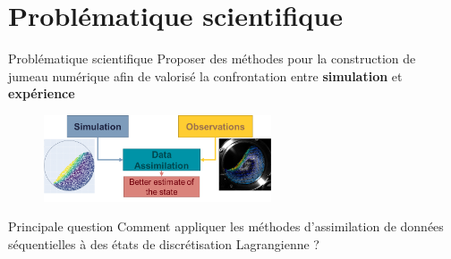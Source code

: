 \documentclass[aspectratio=169]{beamer} %
\begin{document}
\section{Problématique scientifique}
\begin{frame}{Problématique scientifique}
    Proposer des méthodes pour la construction de jumeau numérique afin de valorisé la confrontation entre \textbf{simulation} et \textbf{expérience}
    \begin{figure}
        \includegraphics[width = 0.6\textwidth]{image/da_rot_drum.png}
    \end{figure}

    \begin{alertblock}{Principale question}
        Comment appliquer les méthodes d'assimilation de données séquentielles à des états de discrétisation Lagrangienne ?
    \end{alertblock}

\end{frame}
\end{document}
